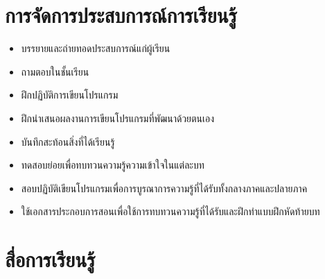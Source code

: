 \section*{การจัดการประสบการณ์การเรียนรู้}

\begin{itemize}
\item บรรยายและถ่ายทอดประสบการณ์แก่ผู้เรียน
\item ถามตอบในชั้นเรียน
\item ฝึกปฏิบัติการเขียนโปรแกรม
\item  ฝึกนำเสนอผลงานการเขียนโปรแกรมที่พัฒนาด้วยตนเอง
\item  บันทึกสะท้อนสิ่งที่ได้เรียนรู้
\item  ทดสอบย่อยเพื่อทบทวนความรู้ความเข้าใจในแต่ละบท
\item  สอบปฏิบัติเขียนโปรแกรมเพื่อการบูรณาการความรู้ที่ได้รับทั้งกลางภาคและปลายภาค
\item  ใช้เอกสารประกอบการสอนเพื่อใช้การทบทวนความรู้ที่ได้รับและฝึกทำแบบฝึกหัดท้ายบท
\end{itemize}


\section*{สื่อการเรียนรู้}

